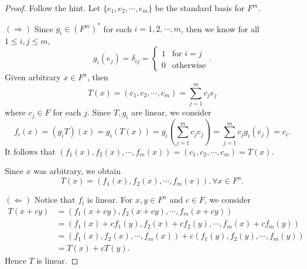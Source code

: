 \begin{Exercise}
	\begin{proof}
		Follow the hint. Let $\{e_1,e_2,\cdots,e_m\}$ be the standard basis for $F^m$.
		
		$(\Longrightarrow)$
		Since $g_i\in (F^m)^*$ for each $i=1,2,\cdots,m$, then we know for all $1\leq i,j\leq m$,
		$$
		g_i(e_j) = \delta_{i j} = \begin{cases}
		1 & \mbox{for } i=j \\
		0 & \mbox{otherwise}
		\end{cases}.
		$$
		Given arbitrary $x\in F^n$, then
		$$
		T(x) = (c_1,c_2,\cdots,c_m) = \sum_{j=1}^{m} c_j e_j
		$$
		where $c_j \in F$ for each $j$. Since $T, g_i$ are linear, we consider
		$$
		f_i(x) = (g_i T)(x) = g_i(T(x)) = g_i(\sum_{j=1}^{m} c_j e_j) = \sum_{j=1}^{m} c_j g_i(e_j) = c_i.
		$$
		It follows that
		$(f_1(x), f_2(x), \cdots, f_m(x)) = (c_1, c_2, \cdots, c_m) = T(x)$.
		
		Since $x$ was arbitrary, we obtain
		$$
		T(x) = (f_1(x), f_2(x), \cdots, f_m(x)), \forall x\in F^n.
		$$
		
		\vspace{2ex}
		
		$(\Longleftarrow)$
		Notice that $f_i$ is linear. For $x,y \in F^n$ and $c\in F$, we consider
		\begin{align*}
		T(x+c y)
		&= ( f_1(x+c y), f_2(x+c y), \cdots, f_m(x+c y) ) \\
		&= ( f_1(x)+c f_1(y), f_2(x)+c f_2(y), \cdots, f_m(x)+c f_m(y) ) \\
		&= ( f_1(x), f_2(x), \cdots, f_m(x) ) + c( f_1(y), f_2(y), \cdots, f_m(y) ) \\
		&= T(x) + c T(y).
		\end{align*}
		Hence $T$ is linear.
	\end{proof}
\end{Exercise}
